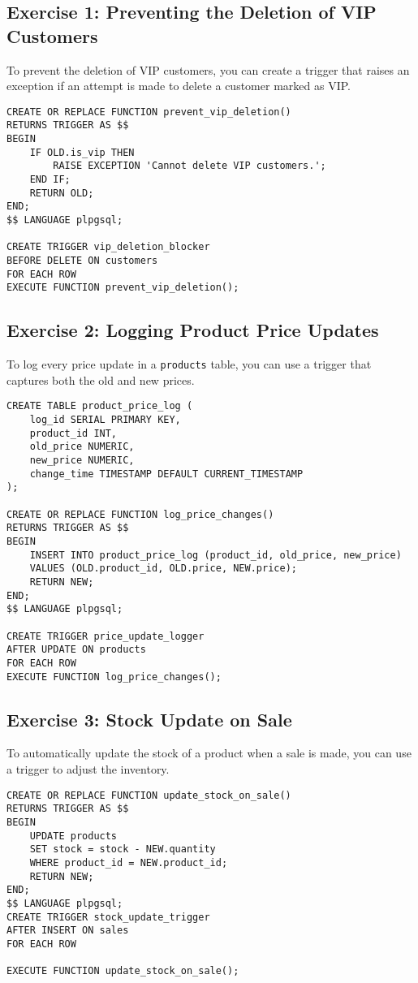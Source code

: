 \documentclass{article}
\begin{document}
\subsection*{Exercise 1: Preventing the Deletion of VIP Customers}
To prevent the deletion of VIP customers, you can create a trigger that raises an exception if an attempt is made to delete a customer marked as VIP.

\begin{verbatim}
CREATE OR REPLACE FUNCTION prevent_vip_deletion()
RETURNS TRIGGER AS $$
BEGIN
    IF OLD.is_vip THEN
        RAISE EXCEPTION 'Cannot delete VIP customers.';
    END IF;
    RETURN OLD;
END;
$$ LANGUAGE plpgsql;

CREATE TRIGGER vip_deletion_blocker
BEFORE DELETE ON customers
FOR EACH ROW
EXECUTE FUNCTION prevent_vip_deletion();
\end{verbatim}

\subsection*{Exercise 2: Logging Product Price Updates}
To log every price update in a \texttt{products} table, you can use a trigger that captures both the old and new prices.

\begin{verbatim}
CREATE TABLE product_price_log (
    log_id SERIAL PRIMARY KEY,
    product_id INT,
    old_price NUMERIC,
    new_price NUMERIC,
    change_time TIMESTAMP DEFAULT CURRENT_TIMESTAMP
);

CREATE OR REPLACE FUNCTION log_price_changes()
RETURNS TRIGGER AS $$
BEGIN
    INSERT INTO product_price_log (product_id, old_price, new_price)
    VALUES (OLD.product_id, OLD.price, NEW.price);
    RETURN NEW;
END;
$$ LANGUAGE plpgsql;

CREATE TRIGGER price_update_logger
AFTER UPDATE ON products
FOR EACH ROW
EXECUTE FUNCTION log_price_changes();
\end{verbatim}

\subsection*{Exercise 3: Stock Update on Sale}
To automatically update the stock of a product when a sale is made, you can use a trigger to adjust the inventory.

\begin{verbatim}
CREATE OR REPLACE FUNCTION update_stock_on_sale()
RETURNS TRIGGER AS $$
BEGIN
    UPDATE products
    SET stock = stock - NEW.quantity
    WHERE product_id = NEW.product_id;
    RETURN NEW;
END;
$$ LANGUAGE plpgsql;
CREATE TRIGGER stock_update_trigger
AFTER INSERT ON sales
FOR EACH ROW

EXECUTE FUNCTION update_stock_on_sale();
\end{verbatim}
\end{document}
